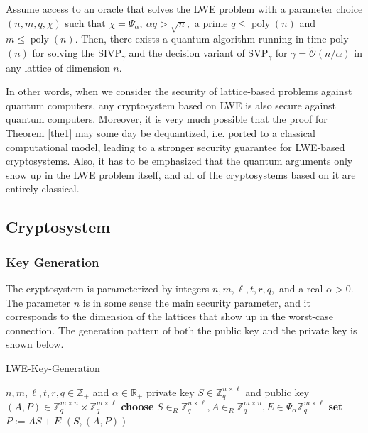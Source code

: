 \begin{theorem}
    Assume access to an oracle that solves the LWE problem with a parameter choice $(n, m, q, \chi)$ such that $\chi=\Psi_{\alpha},\ \alpha q>\sqrt{n},$ a prime $q \leq \operatorname{poly}(n)$ and $m \leq \operatorname{poly}(n) .$ Then, there exists a quantum algorithm running in time poly $(n)$ for solving the SIVP$_{\gamma}$ and the decision variant of SVP$_{\gamma}$ for $\gamma=\tilde{\mathcal{O}}(n / \alpha)$ in any lattice of dimension $n$.\label{the1}
\end{theorem}

In other words, when we consider the security of lattice-based problems against quantum computers, any cryptosystem based on LWE is also secure against quantum computers. Moreover, it is very much possible that the proof for Theorem \ref{the1} may some day be dequantized, i.e. ported to a classical computational model, leading to a stronger security guarantee for LWE-based cryptosystems. Also, it has to be emphasized that the quantum arguments only show up in the LWE problem itself, and all of the cryptosystems based on it are entirely classical.

\subsection{Cryptosystem}

\subsubsection{Key Generation}

The cryptosystem is parameterized by integers $n, m, \ell, t, r, q,$ and a real $\alpha>0$. The parameter $n$ is in some sense the main security parameter, and it corresponds to the dimension of the lattices that show up in the worst-case connection. The generation pattern of both the public key and the private key is shown below.

\begin{algorithm}
    \caption{LWE-Key-Generation}
    \begin{algorithmic}[1]
        \Require $n, m, \ell, t, r, q \in \mathbb{Z}_{+}$ and $\alpha \in \mathbb{R}_{+}$
        \Ensure private key $S \in \mathbb{Z}_{q}^{n \times \ell}$ and public key $(A, P) \in \mathbb{Z}_{q}^{m \times n} \times \mathbb{Z}_{q}^{m \times \ell}$
        \State \textbf{choose} $S \in_{R} \mathbb{Z}_{q}^{n \times \ell}, A \in_{R} \mathbb{Z}_{q}^{m \times n}, E \in \Psi_{\alpha} \mathbb{Z}_{q}^{m \times \ell}$
        \State \textbf{set} $P :=A S+E$
        \State \Return $(S,(A, P))$
    \end{algorithmic}
\end{algorithm}

